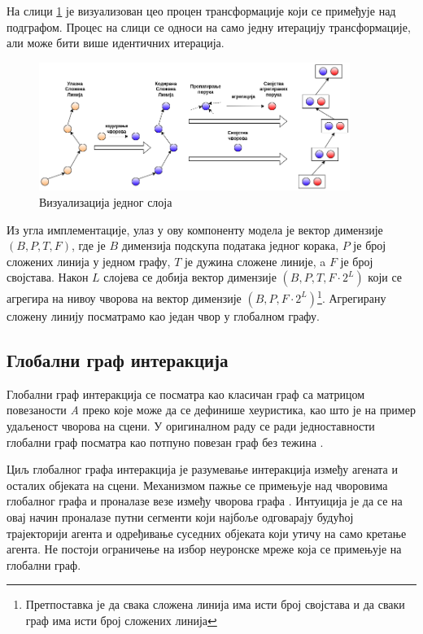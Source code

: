 \documentclass[11pt,oneside]{memoir}
\begin{document}
На слици \ref{vectornet-subgraph} је визуализован цео процен трансформације који се примеђује над подграфом. Процес на слици се односи на само
једну итерацију трансформације, али може бити више идентичних итерација.

\begin{figure}[H]
  \centering
  \includegraphics[width=0.9\textwidth]{images/vectornet-subgraph-rs.drawio.png}
  \caption{Визуализација једног слоја \label{vectornet-subgraph}}
\end{figure}

Из угла имплементације, улаз у ову компоненту модела је вектор димензије $(B, P, T, F)$, где је $B$ димензија подскупа података једног корака, 
$P$ је број сложених линија у једном графу, $T$ је дужина сложене линије, a $F$ је број својстава. Након $L$ слојева се добија вектор димензије 
$(B, P, T, F \cdot 2^{L})$ који се агрегира на нивоу чворова на вектор димензије
$(B, P, F \cdot 2^{L})$\footnote{Претпоставка је да свака сложена линија има исти број својстава и да сваки граф има исти број сложених линија}. 
Агрегирану сложену линију посматрамо као један чвор у глобалном графу.
         
\subsection{Глобални граф интеракција}

Глобални граф интеракција се посматра као класичан граф са матрицом повезаности \textit{A} преко које може да се дефинише хеуристика, као што је на пример удаљеност
чворова на сцени. У оригиналном раду се ради једноставности глобални граф посматра као потпуно повезан граф без тежина \cite{vectornet}.

Циљ глобалног графа интеракција је разумевање интеракција између агената и осталих објеката на сцени. Механизмом пажње се примењује над 
чворовима глобалног графа и проналазе везе између чворова графа \cite{attention_is_all_you_need}. Интуиција је да се на овај начин проналазе путни сегменти који најбоље одговарају будућој трајекторији агента и 
одређивање суседних објеката који утичу на само кретање агента. Не постоји ограничење на избор неуронске мреже која се примењује на глобални граф.
\end{document}
